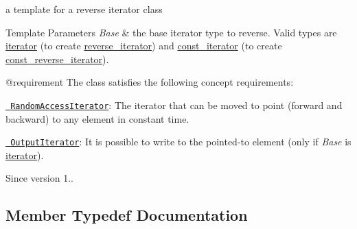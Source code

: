 a template for a reverse iterator class 


\begin{DoxyTemplParams}{Template Parameters}
{\em Base} & the base iterator type to reverse. Valid types are \mbox{\hyperlink{classnlohmann_1_1basic__json_a099316232c76c034030a38faa6e34dca}{iterator}} (to create \mbox{\hyperlink{classnlohmann_1_1basic__json_ac223d5560c2b05a208c88de67376c5f2}{reverse\+\_\+iterator}}) and \mbox{\hyperlink{classnlohmann_1_1basic__json_a41a70cf9993951836d129bb1c2b3126a}{const\+\_\+iterator}} (to create \mbox{\hyperlink{classnlohmann_1_1basic__json_a72be3c24bfa24f0993d6c11af03e7404}{const\+\_\+reverse\+\_\+iterator}}).\\
\hline
\end{DoxyTemplParams}
@requirement The class satisfies the following concept requirements\+:
\begin{DoxyItemize}
\item \href{http://en.cppreference.com/w/cpp/concept/RandomAccessIterator}{\texttt{ Random\+Access\+Iterator}}\+: The iterator that can be moved to point (forward and backward) to any element in constant time.
\item \href{http://en.cppreference.com/w/cpp/concept/OutputIterator}{\texttt{ Output\+Iterator}}\+: It is possible to write to the pointed-\/to element (only if {\itshape Base} is \mbox{\hyperlink{classnlohmann_1_1basic__json_a099316232c76c034030a38faa6e34dca}{iterator}}).
\end{DoxyItemize}

\begin{DoxySince}{Since}
version 1.. 
\end{DoxySince}


\subsection{Member Typedef Documentation}
\mbox{\label{classnlohmann_1_1basic__json_1_1json__reverse__iterator_a5b7f3c5d86fe89a65d9552c1cac37261}} 
